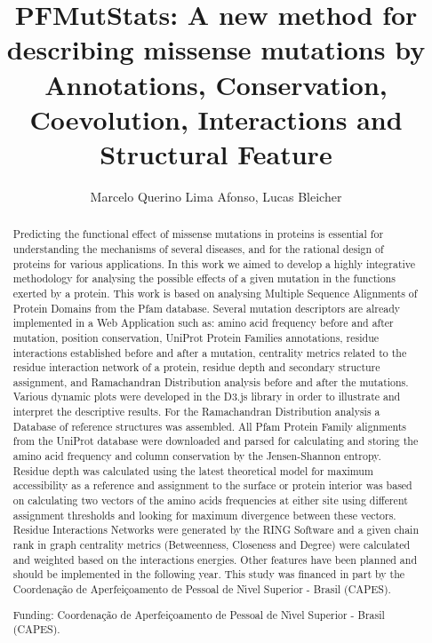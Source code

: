 \documentclass[twoside]{article}
\title{\vspace{-15mm}\fontsize{24pt}{10pt}\selectfont\textbf{ PFMutStats: A new method for describing missense mutations by Annotations,  Conservation,  Coevolution,  Interactions and Structural Feature }} %
\author{ Marcelo Querino Lima Afonso, Lucas Bleicher }
\affil{ Universidade Federal de Minas Gerais }
\date{}
\begin{document}
  
  
  \maketitle %
  
  
  \thispagestyle{fancy} %
  
  
  \begin{abstract}
  Predicting the functional effect of missense mutations in proteins is essential for understanding the mechanisms of several diseases,  and for the rational design of proteins for various applications. In this work we aimed to develop a highly integrative methodology for analysing the possible effects of a given mutation in the functions exerted by a protein.
This work is based on analysing Multiple Sequence Alignments of Protein Domains from the Pfam database. Several mutation descriptors are already implemented in a Web Application such as: amino acid frequency before and after mutation,  position conservation,  UniProt Protein Families annotations,  residue interactions established before and after a mutation,  centrality metrics related to the residue interaction network of a protein,  residue depth and secondary structure assignment,  and Ramachandran Distribution analysis before and after the mutations. Various dynamic plots were developed in the D3.js library in order to illustrate and interpret the descriptive results. For the Ramachandran Distribution analysis a Database of reference structures was assembled.
All Pfam Protein Family alignments from the UniProt database were downloaded and parsed for calculating and storing the amino acid frequency and column conservation by the Jensen-Shannon entropy. Residue depth was calculated using the latest theoretical model for maximum accessibility as a reference and assignment to the surface or protein interior was based on calculating two vectors of the amino acids frequencies at either site using different assignment thresholds and looking for maximum divergence between these vectors. Residue Interactions Networks were generated by the RING Software and a given chain rank in graph centrality metrics (Betweenness,  Closeness and Degree) were calculated and weighted based on the interactions energies. Other features have been planned and should be implemented in the following year.
This study was financed in part by the Coordena\c{c}\~ao de Aperfei\c{c}oamento de Pessoal de N\'{\i}vel Superior - Brasil (CAPES).
  
  Funding: Coordena\c{c}\~ao de Aperfei\c{c}oamento de Pessoal de N\'{\i}vel Superior - Brasil (CAPES). \\ 
  \end{abstract}
  
\end{document}
